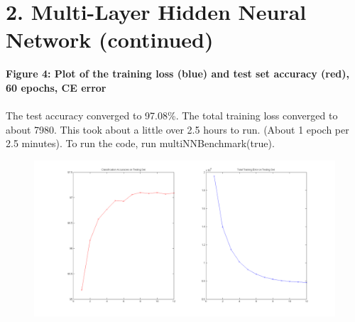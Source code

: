 \documentclass[11pt]{article}
\begin{document}
\section*{2. Multi-Layer Hidden Neural Network (continued)}
\textbf{Figure 4: Plot of the training loss (blue) and test set accuracy (red), 60 epochs, CE error} \\\\
The test accuracy converged to 97.08\%. The total training loss converged to about 7980. This took about a little over 2.5 hours to run. (About 1 epoch per 2.5 minutes). To run the code, run multiNNBenchmark(true).
\\
\begin{figure}[ht!]
\centering
\includegraphics[width=180mm]{plots/finalp2ce.png}
\label{overflow}
\end{figure}
\end{document}
